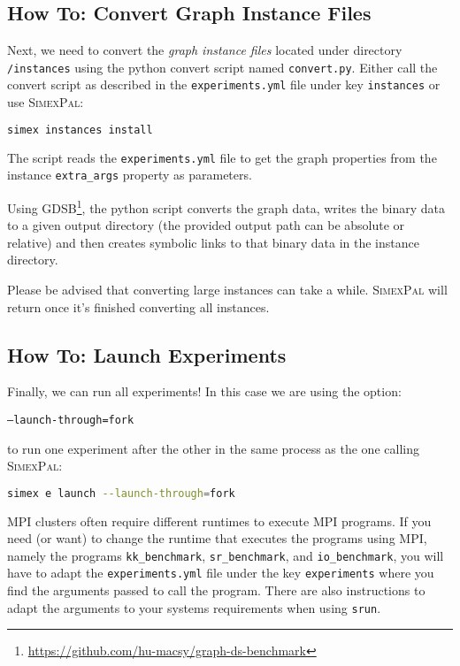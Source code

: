 \documentclass[11pt, a4paper]{scrartcl}
\newcommand{\expfile}{\texttt{experiments.yml} file\xspace}
\newcommand{\simex}{\textsc{Simex\-Pal}\xspace}
\begin{document}
\subsection{How To: Convert Graph Instance Files}\label{sec:getting_started:convert_instances}

Next, we need to convert the \textit{graph instance files} located under
directory \texttt{/instances} using the python convert script named
\texttt{convert.py}. Either call the convert script as described in the \expfile
under key \texttt{instances} or use \simex:

\begin{lstlisting}[language=bash]
simex instances install
\end{lstlisting}

The script reads the \expfile to get the graph properties from the instance
\texttt{extra\_args} property as parameters.

Using GDSB\footnote{\url{https://github.com/hu-macsy/graph-ds-benchmark}}, the
python script converts the graph data, writes the binary data to a given output
directory (the provided output path can be absolute or relative) and then
creates symbolic links to that binary data in the instance directory.

Please be advised that converting large instances can take a while. \simex will
return once it's finished converting all instances.

\subsection{How To: Launch Experiments}\label{sec:getting_started:launch_experiments}

Finally, we can run all experiments! In this case we are using the option:

\texttt{---launch-through=fork}

\noindent to run one experiment after the other in the same process as the one
calling \simex:

\begin{lstlisting}[language=bash]
simex e launch --launch-through=fork
\end{lstlisting}

MPI clusters often require different runtimes to execute MPI programs. If you
need (or want) to change the runtime that executes the programs using MPI,
namely the programs \texttt{kk\_benchmark}, \texttt{sr\_benchmark}, and
\texttt{io\_benchmark}, you will have to adapt the \expfile under the key
\texttt{experiments} where you find the arguments passed to call the program.
There are also instructions to adapt the arguments to your systems requirements
when using \texttt{srun}.
\end{document}
